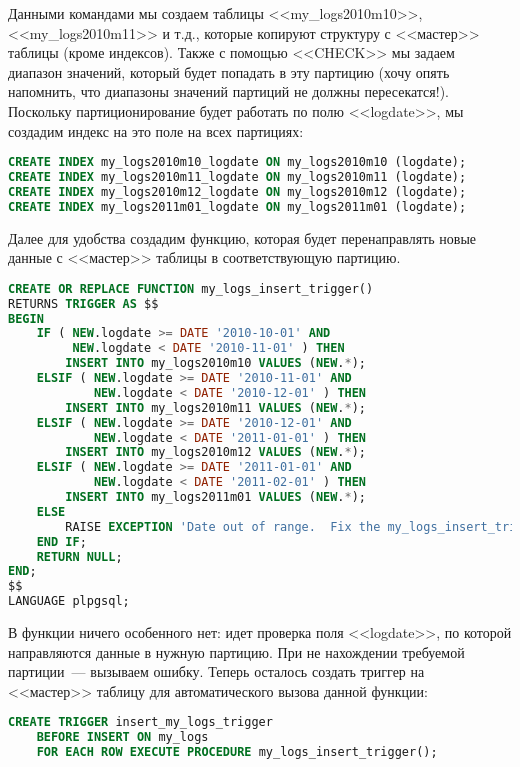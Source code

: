 Данными командами мы создаем таблицы <<my\_logs2010m10>>, <<my\_logs2010m11>> и т.д., которые копируют структуру с <<мастер>> 
таблицы (кроме индексов). Также с помощью <<CHECK>> мы задаем диапазон значений, который будет попадать в эту партицию 
(хочу опять напомнить, что диапазоны значений партиций не должны пересекатся!). Поскольку партиционирование будет работать 
по полю <<logdate>>, мы создадим индекс на это поле на всех партициях:
\begin{lstlisting}[language=SQL,label=lst:partitioning4,caption=Создание индексов]
CREATE INDEX my_logs2010m10_logdate ON my_logs2010m10 (logdate);
CREATE INDEX my_logs2010m11_logdate ON my_logs2010m11 (logdate);
CREATE INDEX my_logs2010m12_logdate ON my_logs2010m12 (logdate);
CREATE INDEX my_logs2011m01_logdate ON my_logs2011m01 (logdate);
\end{lstlisting}

Далее для удобства создадим функцию, которая будет перенаправлять новые данные с <<мастер>> таблицы в соответствующую партицию.
\begin{lstlisting}[language=SQL,label=lst:partitioning5,caption=Функция для перенаправления]
CREATE OR REPLACE FUNCTION my_logs_insert_trigger()
RETURNS TRIGGER AS $$
BEGIN
    IF ( NEW.logdate >= DATE '2010-10-01' AND
         NEW.logdate < DATE '2010-11-01' ) THEN
        INSERT INTO my_logs2010m10 VALUES (NEW.*);
    ELSIF ( NEW.logdate >= DATE '2010-11-01' AND
            NEW.logdate < DATE '2010-12-01' ) THEN
        INSERT INTO my_logs2010m11 VALUES (NEW.*);
    ELSIF ( NEW.logdate >= DATE '2010-12-01' AND
            NEW.logdate < DATE '2011-01-01' ) THEN
        INSERT INTO my_logs2010m12 VALUES (NEW.*);
    ELSIF ( NEW.logdate >= DATE '2011-01-01' AND
            NEW.logdate < DATE '2011-02-01' ) THEN
        INSERT INTO my_logs2011m01 VALUES (NEW.*);
    ELSE
        RAISE EXCEPTION 'Date out of range.  Fix the my_logs_insert_trigger() function!';
    END IF;
    RETURN NULL;
END;
$$
LANGUAGE plpgsql;
\end{lstlisting}

В функции ничего особенного нет: идет проверка поля <<logdate>>, по которой направляются данные в нужную партицию. 
При не нахождении требуемой партиции~--- вызываем ошибку. Теперь осталось создать триггер на <<мастер>> таблицу 
для автоматического вызова данной функции:
\begin{lstlisting}[language=SQL,label=lst:partitioning6,caption=Триггер]
CREATE TRIGGER insert_my_logs_trigger
    BEFORE INSERT ON my_logs
    FOR EACH ROW EXECUTE PROCEDURE my_logs_insert_trigger();
\end{lstlisting}

